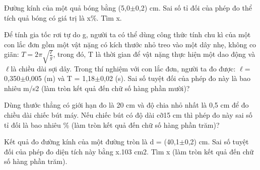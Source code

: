 \begin{ex} Đường kính của một quả bóng bằng (5,0$\pm$0,2) cm. Sai số tỉ đối của phép đo thể
tích quả bóng có giá trị là x\%. Tìm x.

\par{}
\end{ex}

\begin{ex} Để tính gia tốc rơi tự do g, người ta có thể dùng công thức tính chu kì của một
con lắc đơn gồm một vật nặng có kích thước nhỏ treo vào một dây nhẹ, không co giãn:
$T = 2\pi \sqrt{\frac{\ell}{g}}$, trong đó, T là thời gian để vật nặng thực hiện một dao động và $\ell$là chiều
dài sợi dây. Trong thí nghiệm với con lắc đơn, người ta đo được: $\ell$= 0,350$\pm$0,005 (m) và
T = 1,18$\pm$0,02 (s). Sai số tuyệt đối của phép đo này là bao nhiêu m/s2 (làm tròn kết quả
đến chữ số hàng phần mười)?

\par{}
\end{ex}

\begin{ex} Dùng thước thẳng có giới hạn đo là 20 cm và độ chia nhỏ nhất là 0,5 cm để đo
chiều dài chiếc bút máy. Nếu chiếc bút có độ dài cỡ15 cm thì phép đo này sai số tỉ đối là
bao nhiêu \% (làm tròn kết quả đến chữ số hàng phần trăm)?

\par{}
\end{ex}

\begin{ex} Kết quả đo đường kính của một đường tròn là d = (40,1$\pm$0,2) cm. Sai số tuyệt
đối của phép đo diện tích này bằng x.103 cm2. Tìm x (làm tròn kết quả đến chữ số hàng
phần trăm).

\par{}
\end{ex}

